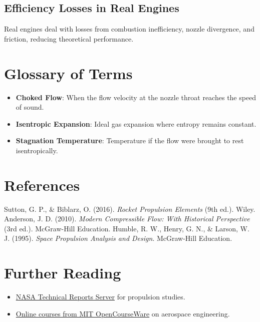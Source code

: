 \documentclass[12pt]{report}
\begin{document}
\subsection{Efficiency Losses in Real Engines}
Real engines deal with losses from combustion inefficiency, nozzle divergence, and friction, reducing theoretical performance.

\section{Glossary of Terms}
\begin{itemize}
    \item \textbf{Choked Flow}: When the flow velocity at the nozzle throat reaches the speed of sound.
    \item \textbf{Isentropic Expansion}: Ideal gas expansion where entropy remains constant.
    \item \textbf{Stagnation Temperature}: Temperature if the flow were brought to rest isentropically.
\end{itemize}

\section{References}
\begin{thebibliography}{9}
     Sutton, G. P., \& Biblarz, O. (2016). \emph{Rocket Propulsion Elements} (9th ed.). Wiley.
     Anderson, J. D. (2010). \emph{Modern Compressible Flow: With Historical Perspective} (3rd ed.). McGraw-Hill Education.
     Humble, R. W., Henry, G. N., \& Larson, W. J. (1995). \emph{Space Propulsion Analysis and Design}. McGraw-Hill Education.
\end{thebibliography}

\section{Further Reading}
\begin{itemize}
    \item \href{https://ntrs.nasa.gov/}{NASA Technical Reports Server} for propulsion studies.
    \item \href{https://ocw.mit.edu/courses/aeronautics-and-astronautics/}{Online courses from MIT OpenCourseWare} on aerospace engineering.
\end{itemize}
\end{document}
